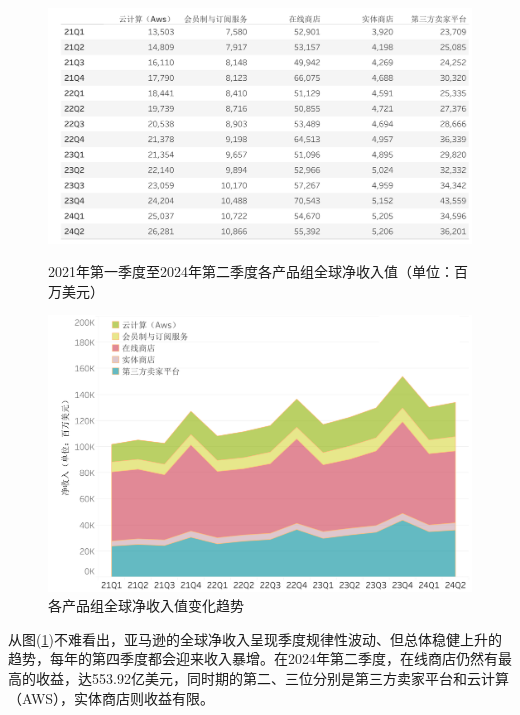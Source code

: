 \documentclass[12pt]{ctexart}
\begin{document}
\begin{figure}[htbp!]
    \begin{minipage}[t]{0.55\textwidth}
        \centering
        \includegraphics[width=\textwidth]{Images/Book2_00.png}
        \caption{2021年第一季度至2024年第二季度各产品组全球净收入值（单位：百万美元）}
        \label{val}
    \end{minipage}
    \begin{minipage}[t]{0.45\textwidth}
        \centering
        \includegraphics[width=\textwidth]{Images/Book1_00.png}
        \caption{各产品组全球净收入值变化趋势}
        \label{trd}
    \end{minipage}
\end{figure}

从图(\ref{trd})不难看出，亚马逊的全球净收入呈现季度规律性波动、但总体稳健上升的趋势，每年的第四季度都会迎来收入暴增。在2024年第二季度，在线商店仍然有最高的收益，达553.92亿美元，同时期的第二、三位分别是第三方卖家平台和云计算（AWS），实体商店则收益有限。
\end{document}
